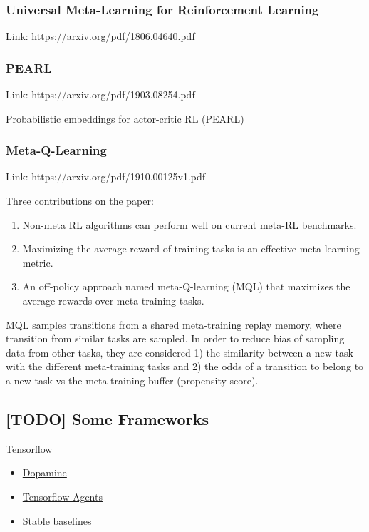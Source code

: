 \documentclass[12pt, english]{article}
\begin{document}
\subsubsection{Universal Meta-Learning for Reinforcement Learning}

Link: https://arxiv.org/pdf/1806.04640.pdf


\subsubsection{PEARL}

Link: https://arxiv.org/pdf/1903.08254.pdf

Probabilistic embeddings for actor-critic RL (PEARL)

\subsubsection{Meta-Q-Learning}

Link: https://arxiv.org/pdf/1910.00125v1.pdf

Three contributions on the paper:

\begin{enumerate}
  \item Non-meta RL algorithms can perform well on current meta-RL benchmarks.
  \item Maximizing the average reward of training tasks is an effective meta-learning metric.
  \item An off-policy approach named meta-Q-learning (MQL) that maximizes the average rewards over meta-training tasks.
\end{enumerate}

MQL samples transitions from a shared meta-training replay memory, where transition from similar tasks are sampled. In order to reduce bias of sampling data from other tasks, they are considered 1) the similarity between a new task with the different meta-training tasks and 2) the odds of a transition to belong to a new task vs the meta-training buffer (propensity score).



\subsection{[TODO] Some Frameworks}

Tensorflow

\begin{itemize}
  \item \href{}{Dopamine}
  \item \href{}{Tensorflow Agents}
  \item \href{https://stable-baselines.readthedocs.io/en/master/}{Stable baselines}
\end{itemize}
\end{document}
